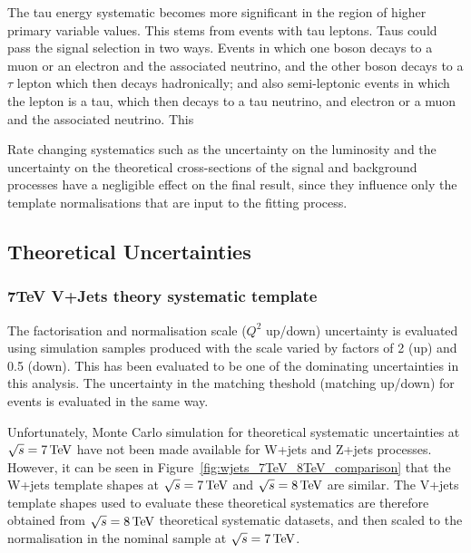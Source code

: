 The tau energy systematic becomes more significant in the region of higher primary variable values. This stems
from \ttbar events with tau leptons. Taus could pass the signal selection in two ways. Events in which one \W
boson decays to a muon or an electron and the associated neutrino, and the other \W boson decays to a $\tau$
lepton which then decays hadronically; and also semi-leptonic events in which the lepton is a tau, which then
decays to a tau neutrino, and electron or a muon and the associated neutrino. This 

Rate changing systematics such as the uncertainty on the luminosity and the uncertainty on the theoretical
cross-sections of the signal and background processes have a negligible effect on the final result, since they
influence only the template normalisations that are input to the fitting process.

\subsection{Theoretical Uncertainties}
\label{ss:theoretical_uncertainties}

\subsubsection{7TeV V+Jets theory systematic template}
\label{sss:7TeV_vjets_theory_systematic_template}

The factorisation and normalisation scale ($Q^{2}$ up/down) uncertainty is evaluated using simulation samples
produced with the scale varied by factors of 2 (up) and 0.5 (down). This has been evaluated to be one of the
dominating uncertainties in this analysis. The uncertainty in the matching theshold (matching up/down) for
\ttbar events is evaluated in the same way.

Unfortunately, Monte Carlo simulation for theoretical systematic uncertainties at $\sqrt{s}=7\,\text{Te\hspace{-.08em}V}$ have not
been made available for W+jets and Z+jets processes. However, it can be seen in
Figure~\ref{fig:wjets_7TeV_8TeV_comparison} that the W+jets template shapes at $\sqrt{s}=7\,\text{Te\hspace{-.08em}V}$ and
$\sqrt{s}=8\,\text{Te\hspace{-.08em}V}$ are similar. The V+jets template shapes used to evaluate these theoretical systematics are
therefore obtained from $\sqrt{s}=8\,\text{Te\hspace{-.08em}V}$ theoretical systematic datasets, and then scaled to the normalisation
in the nominal sample at $\sqrt{s}=7\,\text{Te\hspace{-.08em}V}$.

